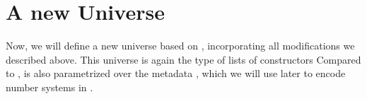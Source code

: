 \section{A new Universe}\label{ssec:desc}



\begin{comment}
    Ik merk dat ik -- door de afstand in tijd (een poosje geleden) en
   ruimte (best een paar blzs terug) -- moeite heb om zo'n grote data
   type als DescI te begrijpen. Kun je misschien toch iets meer uitleg
   geven? Wat is er veranderd? Welke indices zijn toegevoegd/aangepast?
   Er blijft ook een hoop hetzelfde: descriptions zijn lijsten van
   constructors. Iets meer uitleg hier is echt nodig om de code te
   begrijpen.
\end{comment}
Now, we will define a new universe based on , incorporating all modifications we described above. This universe is again the type of lists of constructors
Compared to ,  is also parametrized over the metadata , which we will use later to encode number systems in .

